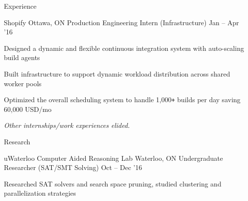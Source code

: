 \documentclass{resume} %
\begin{document}
\begin{rSection}{Experience}
  \begin{rSubsection}{Shopify}
                     {Ottawa, ON}
                     {Production Engineering Intern (Infrastructure)}
                     {Jan -- Apr '16}

  \item Designed a dynamic and flexible continuous integration system with
    auto-scaling build agents
  \item Built infrastructure to support dynamic workload distribution across
    shared worker pools
  \item Optimized the overall scheduling system to handle 1,000\texttt{+} builds per
    day saving 60,000 USD/mo
  \end{rSubsection}

  \begin{rMinisection}
  \item {\em Other internships/work experiences elided.}
  \end{rMinisection}


\end{rSection}


\begin{rSection}{Research}
  \begin{rSubsection}{uWaterloo Computer Aided Reasoning Lab}
                     {Waterloo, ON}
                     {Undergraduate Researcher (SAT/SMT Solving)}
                     {Oct -- Dec '16}
   \item Researched SAT solvers and search space pruning, studied clustering and
     parallelization strategies
  \end{rSubsection}
\end{rSection}

\end{document}
